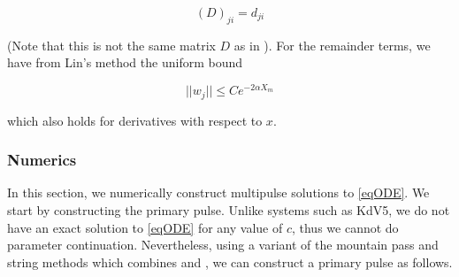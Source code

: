 \documentclass[12pt]{article}
\begin{document}
\begin{equation}\label{matrixD}
(D)_{ji} = d_{ji}
\end{equation}

(Note that this is not the same matrix $D$ as in \cite{Sandstede1998}). For the remainder terms, we have from Lin's method the uniform bound

\begin{equation}\label{sjwbound}
||w_j|| \leq C e^{-2 \alpha X_m}
\end{equation}

which also holds for derivatives with respect to $x$.

\subsubsection{Numerics}

In this section, we numerically construct multipulse solutions to \eqref{eqODE}. We start by constructing the primary pulse. Unlike systems such as KdV5, we do not have an exact solution to \eqref{eqODE} for any value of $c$, thus we cannot do parameter continuation. Nevertheless, using a variant of the mountain pass and string methods which combines \cite{Chen1997} and \cite{Chamard2011}, we can construct a primary pulse as follows.
\end{document}

